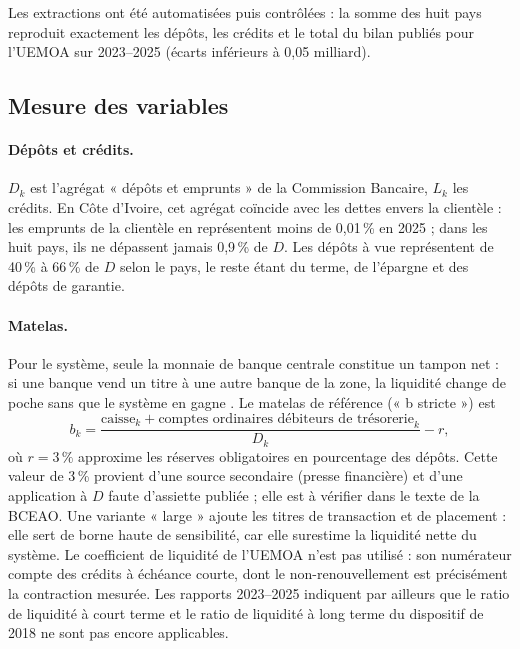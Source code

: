 \documentclass[11pt,a4paper]{article}
\begin{document}
	Les extractions ont été automatisées puis contrôlées : la somme des huit pays reproduit exactement les dépôts, les crédits et le total du bilan publiés pour l'UEMOA sur 2023--2025 (écarts inférieurs à 0,05 milliard).
	
	\subsection{Mesure des variables}\label{sec:calibration}
	
	\paragraph{Dépôts et crédits.} $D_k$ est l'agrégat « dépôts et emprunts » de la Commission Bancaire, $L_k$ les crédits. En Côte d'Ivoire, cet agrégat coïncide avec les dettes envers la clientèle : les emprunts de la clientèle en représentent moins de 0,01\,\% en 2025 ; dans les huit pays, ils ne dépassent jamais 0,9\,\% de $D$. Les dépôts à vue représentent de 40\,\% à 66\,\% de $D$ selon le pays, le reste étant du terme, de l'épargne et des dépôts de garantie.
	
	\paragraph{Matelas.} Pour le système, seule la monnaie de banque centrale constitue un tampon net : si une banque vend un titre à une autre banque de la zone, la liquidité change de poche sans que le système en gagne \citep{bouis2024}. Le matelas de référence (« b stricte ») est
	\begin{equation}\label{eq:b}
		b_k=\frac{\text{caisse}_k+\text{comptes ordinaires débiteurs de trésorerie}_k}{D_k}-r,
	\end{equation}
	où $r=3\,\%$ approxime les réserves obligatoires en pourcentage des dépôts. Cette valeur de 3\,\% provient d'une source secondaire (presse financière) et d'une application à $D$ faute d'assiette publiée ; elle est à vérifier dans le texte de la BCEAO. Une variante « large » ajoute les titres de transaction et de placement : elle sert de borne haute de sensibilité, car elle surestime la liquidité nette du système. Le coefficient de liquidité de l'UEMOA n'est pas utilisé : son numérateur compte des crédits à échéance courte, dont le non-renouvellement est précisément la contraction mesurée. Les rapports 2023--2025 indiquent par ailleurs que le ratio de liquidité à court terme et le ratio de liquidité à long terme du dispositif de 2018 ne sont pas encore applicables.
	
\end{document}
